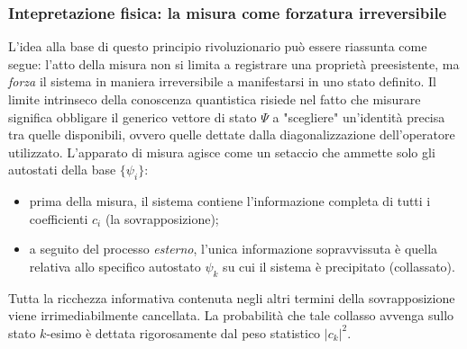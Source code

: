 \documentclass[a4paper,11pt]{report}
\begin{document}
\subsubsection{Intepretazione fisica: la misura come forzatura irreversibile}
L'idea alla base di questo principio rivoluzionario può essere riassunta come segue: l'atto della misura non si limita a registrare una proprietà preesistente, ma \textit{forza} il sistema in maniera irreversibile a manifestarsi in uno stato definito.
Il limite intrinseco della conoscenza quantistica risiede nel fatto che misurare significa obbligare il generico vettore di stato $\Psi$ a "scegliere" un'identità precisa tra quelle disponibili, ovvero quelle dettate dalla diagonalizzazione dell'operatore utilizzato.
L'apparato di misura agisce come un setaccio che ammette solo gli autostati della base $\{\psi_i\}$:
\begin{itemize}
    \item prima della misura, il sistema contiene l'informazione completa di tutti i coefficienti $c_i$ (la sovrapposizione);
    \item a seguito del processo \textit{esterno}, l'unica informazione sopravvissuta è quella relativa allo specifico autostato $\psi_k$ su cui il sistema è precipitato (collassato).
\end{itemize}
Tutta la ricchezza informativa contenuta negli altri termini della sovrapposizione viene irrimediabilmente cancellata. La probabilità che tale collasso avvenga sullo stato $k$-esimo è dettata rigorosamente dal peso statistico $|c_k|^2$.
\end{document}
